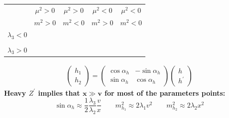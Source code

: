 \documentclass[10pt,xcolor=dvipsnames,mathserif]{beamer}
\newcommand{\red}[0]{\color{red}}
\newcommand{\xmark}{\ding{55}}%
\begin{document}
\begin{frame}
	\begin{table}[htb!]
		\begin{center}
			\begin{tabular}{ccccc}
				\toprule                     
				& $\mu^2 > 0$ & $\mu^2 > 0$ & $\mu^2 < 0$ & {\red $\mu^2 < 0$}  	\\
				& $m^2 > 0$ & $m^2 < 0$ & $m^2 > 0$ & {\red $m^2 < 0$}  	\\        
				\midrule
				$\lambda_3 < 0 $     			    							& \xmark		& \checkmark	&	\checkmark & {\red \checkmark}	\\
				& 		& 	&	 & 	\\
				$\lambda_3 > 0$     			    							& \xmark		& \xmark	&	\xmark & {\red \checkmark}	\\
				\bottomrule
			\end{tabular} 
		\end{center}
	\end{table} 
\vskip3mm
	\begin{equation*}
	\begin{aligned}
	\begin{pmatrix}
	h_1 \\
	h_2 
	\end{pmatrix}
	=
	\begin{pmatrix}
	\cos \alpha_h & -\sin \alpha_h \\
	\sin \alpha_h & \cos \alpha_h 
	\end{pmatrix}
	\begin{pmatrix}
	h \\
	h^\prime 
	\end{pmatrix}
	\end{aligned}
	\end{equation*}
	\vskip0.1mm
	{\bf Heavy $Z^\prime$ implies that $\bm{x \gg v}$ for most of the parameters points:}
	\begin{equation*}
	\sin \alpha_h \approx \dfrac{1}{2}\dfrac{\lambda_3}{\lambda_2} \dfrac{v}{x} \qquad
		m_{h_1}^2 \approx 2 \lambda_1 v^2 \qquad m_{h_2}^2 \approx 2 \lambda_2 x^2
	\end{equation*}

\end{frame}
\end{document}
